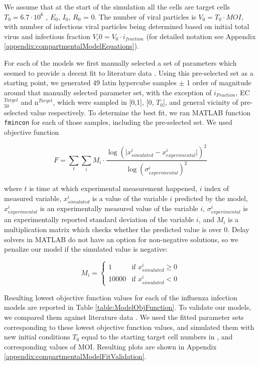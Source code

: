 We assume that at the start of the simulation all the cells are target cells $T_0 = 6.7 \cdot 10^6$ \cite{saenz2010dynamics}, $E_0$, $I_0$, $R_0$ = 0. The number of viral particles is $V_0 = T_0 \cdot MOI$, with number of infectious viral particles being determined based on initial total virus and infectious fraction $V_i0 = V_0 \cdot i_{fraction}$ (for detailed notation see Appendix \ref{appendix:compartmentalModelEquations}).

For each of the models we first manually selected a set of parameters which seemed to provide a decent fit to literature data \cite{rudiger2019multiscale}. Using this pre-selected set as a starting point, we generated 49 latin hypercube samples $\pm$ 1 order of magnitude around that manually selected parameter set, with the exception of $i_{Fraction}$, EC$_{50}^{Target}$ and n$^{Target}$, which were sampled in [0,1], [0, $T_0$], and general vicinity of pre-selected value respectively. To determine the best fit, we ran MATLAB function \texttt{fmincon} for each of those samples, including the pre-selected set. We used objective function

\begin{equation}
F = \sum_t \sum_i M_i \cdot \frac{\log (\big| x^i_{simulated} - x^i_{experimental} \big|)^2}{\log (\sigma^i_{experimental})^2}
\end{equation}

where $t$ is time at which experimental measurement happened, $i$ index of measured variable, $x^i_{simulated}$ is a value of the variable $i$ predicted by the model, $x^i_{experimental}$ is an experimentally measured value of the variable $i$, $\sigma^i_{experimental}$ is an experimentally reported standard deviation of the variable $i$, and $M_i$ is a multiplication matrix which checks whether the predicted value is over 0. Delay solvers in MATLAB do not have an option for non-negative solutions, so we penalize our model if the simulated value is negative:

\begin{equation}
M_i =
\begin{cases}
1 & \mbox{if } x^i_{simulated} \ge 0\\
10000 & \mbox{if } x^i_{simulated} < 0
\end{cases}
\end{equation}

Resulting lowest objective function values for each of the influenza infection models are reported in Table \ref{table:ModelObjFunction}. To validate our models, we compared them against literature data \cite{schulze2009infection}. We used the fitted parameter sets corresponding to these lowest objective function values, and simulated them with new initial conditions $T_0$ equal to the starting target cell numbers in \cite{schulze2009infection}, and corresponding values of MOI. Resulting plots are shown in Appendix \ref{appendix:compartmentalModelFitValidation}.


